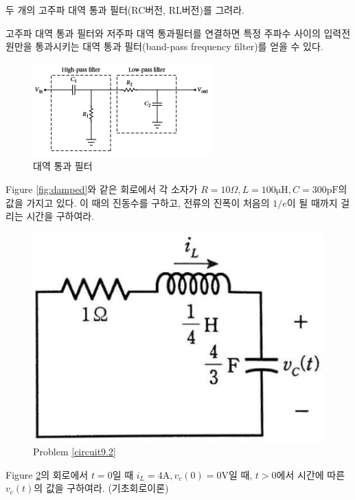 \begin{exercise}
두 개의 고주파 대역 통과 필터(RC버전, RL버전)를 그려라.
\end{exercise}

고주파 대역 통과 필터와 저주파 대역 통과필터를 연결하면 특정 주파수 사이의 입력전원만을 통과시키는 대역 통과 필터(band-pass frequency filter)를 얻을 수 있다.
\begin{figure}[h]
\centering\includegraphics[scale=0.8]{Pictures/band-pass.PNG}
\caption{대역 통과 필터}
\label{fig:band-pass}
\end{figure}


\begin{problem}
Figure \ref{fig:damped}와 같은 회로에서 각 소자가 $R=10\Omega, L=100\mathrm{\mu H}, C=300\mathrm{pF}$의 값을 가지고 있다. 이 때의 진동수를 구하고, 전류의 진폭이 처음의 $1/e$이 될 때까지 걸리는 시간을 구하여라.  
\end{problem}

\begin{problem}\label{circuit9.2}
\begin{figure}[h]
\centering\includegraphics[scale=0.24]{Pictures/circuit9.2.eps}
\caption{Problem \ref{circuit9.2}}
\label{fig:circuit9.2}
\end{figure}
Figure \ref{fig:circuit9.2}의 회로에서 $t=0$일 때 $i_L=4\mathrm{A}, v_c(0)=0\mathrm{V}$일 때, $t>0$에서 시간에 따른 $v_c(t)$의 값을 구하여라. (기초회로이론)
\end{problem}

